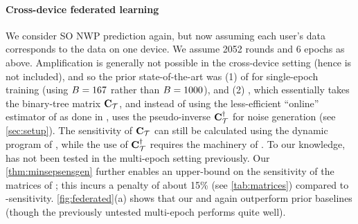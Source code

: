 \documentclass{article}
\begin{document}
\paragraph{Cross-device federated learning}
We consider SO NWP prediction again, but now assuming each user's data corresponds to the data on one device. We assume 2052 rounds and 6 epochs as above. Amplification is generally not possible in the cross-device setting (hence \dpsgd is not included), and so the prior state-of-the-art was (1) \semf of \citet{denisov22matfact} for single-epoch training (using $B=167$ rather than $B=1000$), and (2) \opttreeagg, which essentially takes the binary-tree matrix $\mathbf{C}_{\mathcal{T}}$, and instead of using the less-efficient ``online'' estimator of \citet{honaker2015efficient} as done in \citet{kairouz2021practical}, uses the pseudo-inverse $\mathbf{C}_{\mathcal{T}}^\dagger$ for noise generation (see \cref{sec:setup}). The \bparticipation sensitivity of $\mathbf{C}_{\mathcal{T}}$ can still be calculated using the dynamic program of \citet{kairouz2021practical}, while the use of $\mathbf{C}_{\mathcal{T}}^\dagger$ requires the machinery of \citet{denisov22matfact}. To our knowledge, \opttreeagg has not been tested in the multi-epoch setting previously.  Our \cref{thm:minsepsensgen} further enables an upper-bound on the \bparticipation sensitivity of the \memf matrices of \citet{choquette2022multi}; this incurs a penalty of about 15\% (see \cref{tab:matrices}) compared to \multiepoch-sensitivity.  \cref{fig:federated}(a) shows that our \BANDMF and \memf again outperform prior baselines (though the previously untested multi-epoch \opttreeagg performs quite well).

\end{document}
